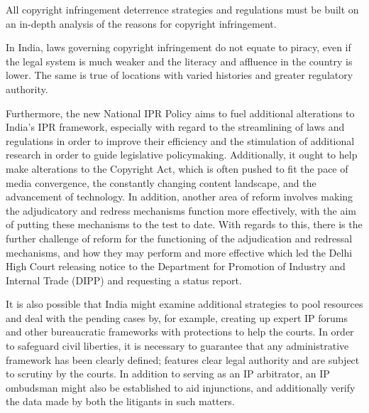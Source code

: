 \begin{multicols}{2}

\noi
All copyright infringement deterrence strategies and regulations must be built on an in-depth
analysis of the reasons for copyright infringement.

\noi
In India, laws governing copyright infringement do not equate to piracy, even if the legal
system is much weaker and the literacy and affluence in the country is lower. The same is
true of locations with varied histories and greater regulatory authority.

\noi
Furthermore, the new National IPR Policy aims to fuel additional alterations to India's IPR
framework, especially with regard to the streamlining of laws and regulations in order to
improve their efficiency and the stimulation of additional research in order to guide
legislative policymaking. Additionally, it ought to help make alterations to the Copyright Act,
which is often pushed to fit the pace of media convergence, the constantly changing content
landscape, and the advancement of technology. In addition, another area of reform involves
making the adjudicatory and redress mechanisms function more effectively, with the aim of
putting these mechanisms to the test to date. With regards to this, there is the further
challenge of reform for the functioning of the adjudication and redressal mechanisms, and
how they may perform and more effective which led the Delhi High Court releasing notice to
the Department for Promotion of Industry and Internal Trade (DIPP) and requesting a status
report.

\noi
It is also possible that India might examine additional strategies to pool resources and deal
with the pending cases by, for example, creating up expert IP forums and other bureaucratic
frameworks with protections to help the courts. In order to safeguard civil liberties, it is
necessary to guarantee that any administrative framework has been clearly defined; features
clear legal authority and are subject to scrutiny by the courts. In addition to serving as an IP
arbitrator, an IP ombudsman might also be established to aid injunctions, and additionally
verify the data made by both the litigants in such matters.

\end{multicols}
